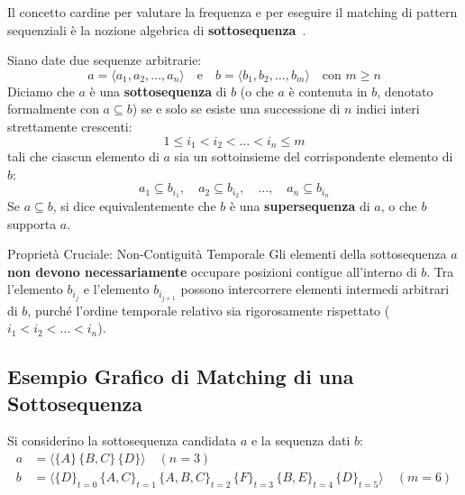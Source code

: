 Il concetto cardine per valutare la frequenza e per eseguire il matching di pattern sequenziali è la nozione algebrica di \textbf{sottosequenza}~\cite{tan2018, agrawal1995}.

\begin{definition}
Siano date due sequenze arbitrarie:
\begin{equation}
a = \langle a_1, a_2, \dots, a_n \rangle \quad \text{e} \quad b = \langle b_1, b_2, \dots, b_m \rangle \quad \text{con } m \ge n
\end{equation}
Diciamo che $a$ è una \textbf{sottosequenza} di $b$ (o che $a$ è contenuta in $b$, denotato formalmente con $a \subseteq b$) se e solo se esiste una successione di $n$ indici interi strettamente crescenti:
\begin{equation}
\label{eq:seq-subsequence-indices}
1 \le i_1 < i_2 < \dots < i_n \le m
\end{equation}
tali che ciascun elemento di $a$ sia un sottoinsieme del corrispondente elemento di $b$:
\begin{equation}
\label{eq:seq-subsequence-inclusion}
a_1 \subseteq b_{i_1}, \quad a_2 \subseteq b_{i_2}, \quad \dots, \quad a_n \subseteq b_{i_n}
\end{equation}
Se $a \subseteq b$, si dice equivalentemente che $b$ è una \textbf{supersequenza} di $a$, o che $b$ supporta $a$.
\end{definition}

\begin{alertblock}{Proprietà Cruciale: Non-Contiguità Temporale}
    Gli elementi della sottosequenza $a$ \textbf{non devono necessariamente} occupare posizioni contigue all'interno di $b$. Tra l'elemento $b_{i_j}$ e l'elemento $b_{i_{j+1}}$ possono intercorrere elementi intermedi arbitrari di $b$, purché l'ordine temporale relativo sia rigorosamente rispettato ($i_1 < i_2 < \dots < i_n$).
\end{alertblock}

\FloatBarrier
\subsection{Esempio Grafico di Matching di una Sottosequenza}
Si considerino la sottosequenza candidata $a$ e la sequenza dati $b$:
\begin{align}
a &= \langle \{A\} \, \{B, C\} \, \{D\} \rangle \quad (n = 3) \\
b &= \langle \{D\}_{t=0} \, \{A, C\}_{t=1} \, \{A, B, C\}_{t=2} \, \{F\}_{t=3} \, \{B, E\}_{t=4} \, \{D\}_{t=5} \rangle \quad (m = 6)
\end{align}

